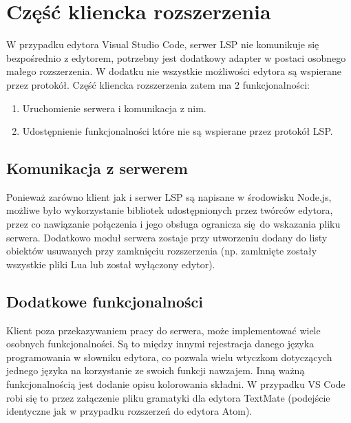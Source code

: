 \chapter{Część kliencka rozszerzenia}
W przypadku edytora Visual Studio Code, serwer LSP nie komunikuje się bezpośrednio z edytorem, potrzebny jest dodatkowy adapter w postaci osobnego małego rozszerzenia. W dodatku nie wszystkie możliwości edytora są wspierane przez protokół. Część kliencka rozszerzenia zatem ma 2 funkcjonalności:

\begin{enumerate}
    \item Uruchomienie serwera i komunikacja z nim.
    \item Udostępnienie funkcjonalności które nie są wspierane przez protokół LSP.
\end{enumerate}

\section{Komunikacja z serwerem}
Ponieważ zarówno klient jak i serwer LSP są napisane w środowisku Node.js, możliwe było wykorzystanie bibliotek udostępnionych przez twórców edytora, przez co nawiązanie połączenia i jego obsługa ogranicza się do wskazania pliku serwera. Dodatkowo moduł serwera zostaje przy utworzeniu dodany do listy obiektów usuwanych przy zamknięciu rozszerzenia (np. zamknięte zostały wszystkie pliki Lua lub został wyłączony edytor).

\section{Dodatkowe funkcjonalności}
Klient poza przekazywaniem pracy do serwera, może implementować wiele osobnych funkcjonalności. Są to między innymi rejestracja danego języka programowania w słowniku edytora, co pozwala wielu wtyczkom dotyczących jednego języka na korzystanie ze swoich funkcji nawzajem. Inną ważną funkcjonalnością jest dodanie opisu kolorowania składni. W przypadku VS Code robi się to przez załączenie pliku gramatyki dla edytora TextMate (podejście identyczne jak w przypadku rozszerzeń do edytora Atom).